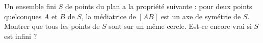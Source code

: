 Un ensemble fini $S$ de points du plan a la propriété suivante : pour deux points quelconques $A$ et $B$ de $S$, la médiatrice de $[AB]$ est un axe de symétrie de $S$. Montrer que tous les points de $S$ sont sur un même cercle. Est-ce encore vrai si $S$ est infini ?
